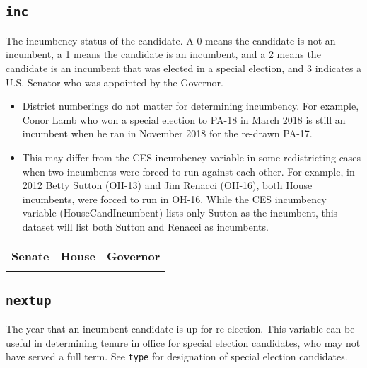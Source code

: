 \documentclass[12pt]{article}
\begin{document}
\twocolumn
\begin{adjustwidth}{-2em}{-2em}
\centering
{\scriptsize

}
\end{adjustwidth}

\onecolumn



\subsection*{\texttt{inc}}

The incumbency status of the candidate. A 0 means the candidate is not an incumbent, a 1 means the candidate is an incumbent, and a 2 means the candidate is an incumbent that was elected in a special election, and 3 indicates a U.S. Senator who was appointed by the Governor.
\begin{itemize}
\item District numberings do not matter for determining incumbency. For example, Conor Lamb who won a special election to PA-18 in March 2018 is still an incumbent when he ran in November 2018 for the re-drawn PA-17.
\item This may differ from the CES incumbency variable in some redistricting cases when two incumbents were forced to run against each other. For example, in 2012 Betty Sutton (OH-13) and Jim Renacci (OH-16), both House incumbents, were forced to run in OH-16. While the CES incumbency variable (HouseCandIncumbent) lists only Sutton as the incumbent, this dataset will list both Sutton and Renacci as incumbents. 

\end{itemize}

    \begin{tabularx}{\linewidth}{CCC}
    \textbf{Senate} & \textbf{House} & \textbf{Governor}\\
     &  & 
    \end{tabularx}


\FloatBarrier


\subsection*{\texttt{nextup}}

The year that an incumbent candidate is up for re-election. This variable can be useful in determining tenure in office for special election candidates, who may not have served a full term. See \texttt{type} for designation of special election candidates. 		
\end{document}
